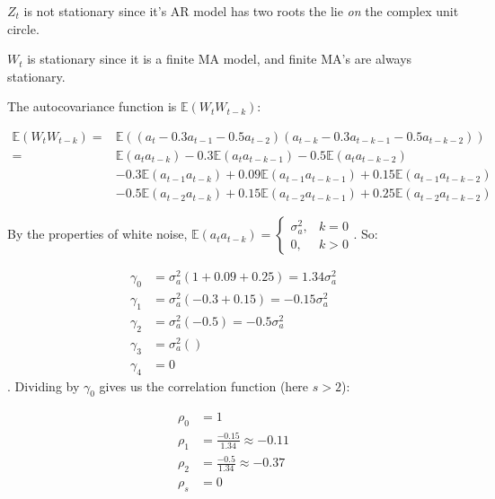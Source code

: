 \documentclass[12pt, letterpaper]{article}
\theoremstyle{definition}
\numberwithin{equation}{section}
\newcommand{\+}[1]{+_{\scalebox{.375}{#1}}}
\newcommand{\E}{\mathbb{E}}
\newcommand{\1}{\mathbbm{1}}
\begin{document}
\newpage
\noindent\textbf{}

\vspace{\baselineskip}
\noindent\textbf{}
\vspace{\baselineskip}

$Z_t$ is not stationary since it's AR model has two roots the lie \textit{on} the complex unit circle.



\vspace{\baselineskip}
\noindent\textbf{}
\vspace{\baselineskip}

$W_t$ is stationary since it is a finite MA model, and finite MA's are always stationary.


\vspace{\baselineskip}
\noindent\textbf{}
\vspace{\baselineskip}

The autocovariance function is $\E(W_{t}W_{t-k})$:

\vspace{-0.5cm}
\begin{align*}
	\E(W_tW_{t-k})=&\E\left((a_t-0.3a_{t-1}-0.5a_{t-2})(a_{t-k}-0.3a_{t-k-1}-0.5a_{t-k-2})\right)\\
	=&\E(a_ta_{t-k}) -0.3\E(a_ta_{t-k-1})-0.5\E(a_ta_{t-k-2})\\
	&-0.3\E(a_{t-1}a_{t-k})+0.09\E(a_{t-1}a_{t-k-1})+0.15\E(a_{t-1}a_{t-k-2})\\
	&-0.5\E(a_{t-2}a_{t-k})+0.15\E(a_{t-2}a_{t-k-1})+0.25\E(a_{t-2}a_{t-k-2})
\end{align*}

By the properties of white noise, $\E(a_{t}a_{t-k})=\begin{cases}
	\sigma_a^2, &\text{$k=0$}\\
	0, &\text{$k>0$}
\end{cases}$. So:

\begin{align*}
	\gamma_0&=\sigma_a^2(1+0.09+0.25)=1.34\sigma_a^2\\ \gamma_1&=\sigma_a^2(-0.3+0.15)=-0.15\sigma_a^2\\
	\gamma_2&=\sigma_a^2(-0.5)=-0.5\sigma_a^2\\
	\gamma_3&=\sigma_a^2()\\
	\gamma_4&=0
\end{align*} . Dividing by $\gamma_0$ gives us the correlation function (here $s>2$):

\begin{align*}
	\rho_0&=1\\
	\rho_1&=\frac{-0.15}{1.34}\approx -0.11\\
	\rho_2&=\frac{-0.5}{1.34}\approx -0.37\\
	\rho_{s}&=0
\end{align*}
\end{document}
